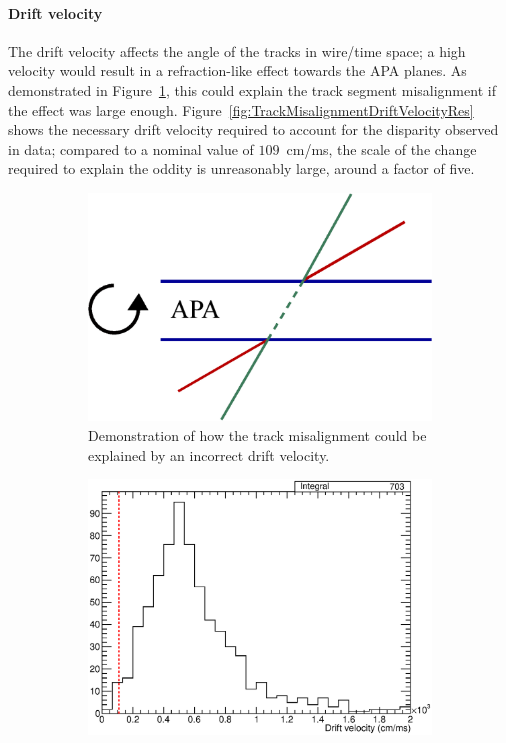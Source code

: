 \paragraph{Drift velocity}

The drift velocity affects the angle of the tracks in wire/time space; a high velocity would result in a refraction-like effect towards the APA planes.  As demonstrated in Figure~\ref{fig:TrackMisalignmentDriftVelocityGeo}, this could explain the track segment misalignment if the effect was large enough.  Figure~\ref{fig:TrackMisalignmentDriftVelocityRes} shows the necessary drift velocity required to account for the disparity observed in data; compared to a nominal value of $109$~cm/ms, the scale of the change required to explain the oddity is unreasonably large, around a factor of five.

\begin{figure}
  \centering
  \begin{subfigure}[t]{0.48\linewidth}
    \centering
    \includegraphics[width=\textwidth]{misalign_track_drift_geo.eps}
    \caption{Demonstration of how the track misalignment could be explained by an incorrect drift velocity.}
    \label{fig:TrackMisalignmentDriftVelocityGeo}
  \end{subfigure}
  \hfill
  \begin{subfigure}[t]{0.48\linewidth}
    \centering
    \includegraphics[width=\textwidth]{misalign_track_drift_res.eps}

\end{subfigure}
\end{figure}
